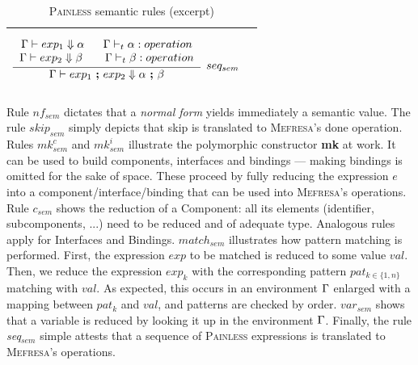 \begin{table}
{\begin{tabular}{| c c |}
$$\infer[seq_{sem}]{\env \vdash exp_1 \ \textbf{;} \ exp_2 \Downarrow  \alpha \ \textbf{;} \ \beta}
{ \begin{tabular}{ c }
$\env \vdash exp_1 \Downarrow \alpha \ \ \ \ \  \env \vdash_t \alpha : operation$ \\
$\env \vdash exp_2 \Downarrow \beta \ \ \ \ \ \  \env \vdash_t \beta : operation$	
	\end{tabular}}$$\\
\hline
\end{tabular}}
\caption{\textsc{Painless} semantic rules (excerpt)}
\label{tab:painlesssemantics}
\end{table}	

		Rule $nf_{sem}$ dictates that a \textit{normal form} yields immediately a semantic value. 
		The rule $skip_{sem}$ simply depicts that \textsf{skip} is
		translated to \textsc{Mefresa}'s \textsf{done} \textsf{operation}.
		Rules $mk^c_{sem}$ and $mk^i_{sem}$ illustrate the polymorphic constructor \textbf{mk} at work.
	    It can be used to build \textsf{components}, \textsf{interfaces} and \textsf{bindings} --- making
	    \textsf{bindings} is omitted for the sake of space.
		These proceed by fully reducing the expression $e$ into a \textsf{component}/\textsf{interface}/\textsf{binding}
		that can be used into \textsc{Mefresa}'s \textsf{operations}. Rule $c_{sem}$ shows
		the reduction of a \textsf{Component}: all its elements (identifier, subcomponents, ...) need to
		be reduced and of adequate type. Analogous rules apply for \textsf{Interfaces} and \textsf{Bindings}.	
		$match_{sem}$ illustrates how pattern matching is performed. First, the expression $exp$ to be matched
		is reduced to some value $val$. Then, we reduce the expression $exp_k$ with the corresponding    
		pattern $pat_{k \in \{1, n\}}$ matching with $val$. As expected, this occurs in an environment $\Gamma$ enlarged
		with a mapping between $pat_k$ and $val$, and patterns are checked by order. $var_{sem}$ shows that a variable is reduced by looking it up 
		in the environment $\Gamma$.	 %
		Finally, the rule \textit{seq$_{sem}$} simple attests that a sequence of \textsc{Painless} expressions 
		is translated to	\textsc{Mefresa}'s \textsf{operation}s. %
					
